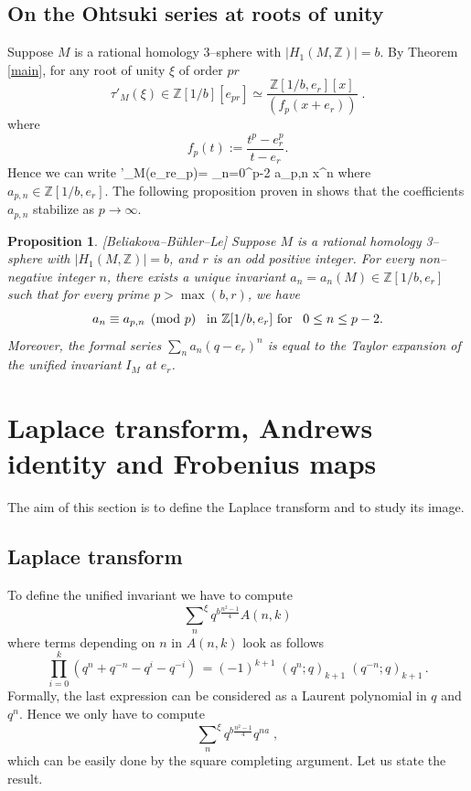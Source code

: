\documentclass[12pt]{amsart}
\def\be#1\ee{\begin{equation}#1\end{equation}}
\theoremstyle{plain}
\newtheorem{proposition}[Thm]{Proposition}%
\theoremstyle{definition}
\def\BZ{\mathbb Z}
\def\Z{\BZ}
\begin{document}
\subsection{On the  Ohtsuki series at roots of unity}\label{Oht}
 Suppose $M$ is a rational
homology 3--sphere with $|H_1(M,\Z)|=b$.
By Theorem \ref{main}, for any root of unity $\xi$ of order $pr$
$$\tau'_M(\xi)\in \Z[1/b][e_{pr}] \simeq \frac{\Z[1/b,e_r][x]}{(f_p(x+e_r))}\; .$$ where
\[
f_p(t):= \frac{t^p - e_r^p}{t-e_r}.
\]
Hence we can write
\be\label{Ohtsuki}
\tau'_M(e_{r}e_{p})= \sum_{n=0}^{p-2} a_{p,n} x^n
\ee
where  $a_{p,n}\in \Z[1/b,e_r]$.
The following proposition proven in \cite{BBL}
shows that the coefficients $a_{p,n}$
stabilize as $p\to \infty$.
\begin{proposition}{\rm [Beliakova--B\"uhler--Le]}
\label{main-cor1} Suppose $M$ is a
rational homology 3--sphere with $|H_1(M,\Z)|=b$, and $r$ is an odd
positive integer.
For every non--negative integer $n$,
there exists a unique invariant $a_n= a_n(M) \in \Z[1/b,e_r]$ such that
for every prime $p > \max (b,r)$,
 we have
\begin{equation}
a_n\equiv a_{p,n} \pmod p\;\;\; \text{in $ \Z[1/b,e_r]$ for} \;\;\;
0\le n \le  p-2.
\label{5501}
\end{equation}
Moreover, the formal series $\sum_{n} a_n (q-e_r)^n$ is equal to the Taylor
 expansion of the unified invariant $I_M$ at $e_r$.
\end{proposition}














\section{Laplace transform, Andrews identity
 and Frobenius maps} \label{map-frob}
The aim of this section is to define the Laplace transform
 and to study its image.



\subsection{Laplace transform}
To define the unified invariant we have to compute
$${\sum_n}^\xi q^{b\frac{n^2-1}{4}} A(n,k)$$
where  terms depending on $n$ in $A(n,k)$ look as follows
$$\prod^k_{i=0} (q^n+q^{-n}-q^i-q^{-i})\,=(-1)^{k+1}\;(q^n;q)_{k+1}\;
(q^{-n};q)_{k+1}\, .$$
Formally, the last expression can be considered as a Laurent polynomial
in $q$ and $q^{n}$. Hence we only have to compute
$${\sum_n}^\xi q^{b\frac{n^2-1}{4}} q^{na}\; ,$$
which can be easily done by the square completing argument.
Let us state the result.
\end{document}
